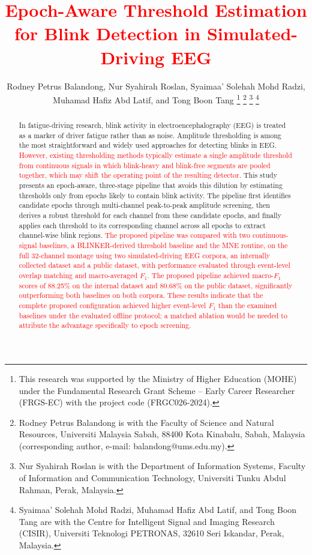 \documentclass[journal,twoside,web]{ieeecolor}
\newcommand{\rev}[1]{\textcolor{red}{#1}}
\begin{document}
%
\title{\rev{Epoch-Aware Threshold Estimation for Blink Detection in Simulated-Driving EEG}}

%
\author{Rodney Petrus Balandong, Nur Syahirah Roslan, Syaimaa' Solehah Mohd Radzi,
Muhamad Hafiz Abd Latif,
%
    and Tong Boon Tang
\thanks{This research was supported by the Ministry of Higher Education (MOHE)
under the Fundamental Research Grant Scheme -- Early Career Researcher
(FRGS-EC) with the project code (FRGC026-2024).}
\thanks{Rodney Petrus Balandong is with the Faculty of Science and Natural
Resources, Universiti Malaysia Sabah, 88400 Kota Kinabalu, Sabah, Malaysia (corresponding
author, e-mail: balandong@ums.edu.my).}
\thanks{Nur Syahirah Roslan is with the Department of Information Systems,
Faculty of Information and Communication Technology, Universiti Tunku Abdul
Rahman, Perak, Malaysia.}
%
%
\thanks{Syaimaa' Solehah Mohd Radzi, Muhamad Hafiz Abd Latif, and Tong Boon
Tang are with the Centre for Intelligent Signal and Imaging Research (CISIR),
Universiti Teknologi PETRONAS, 32610 Seri Iskandar, Perak, Malaysia.}}

\maketitle

%
\begin{abstract}
    In fatigue-driving research, blink activity in electroencephalography (EEG) is treated as a marker of driver fatigue rather than as noise. Amplitude thresholding is among the most straightforward and widely used approaches for detecting blinks in EEG.
\rev{However, existing thresholding methods typically estimate a single amplitude threshold from continuous signals in which blink-heavy and blink-free segments are pooled together, which may shift the operating point of the resulting detector.} This study presents an epoch-aware, three-stage pipeline that avoids this dilution by estimating thresholds only from epochs likely to contain blink activity. The pipeline first identifies candidate epochs through multi-channel peak-to-peak amplitude screening, then derives a robust threshold for each channel from these candidate epochs, and finally applies each threshold to its corresponding channel across all epochs to extract channel-wise blink regions.
\rev{The proposed pipeline was compared with two continuous-signal baselines, a BLINKER-derived threshold baseline and the MNE routine, on the full 32-channel montage using two simulated-driving EEG corpora, an internally collected dataset and a public dataset, with performance evaluated through event-level overlap matching and macro-averaged $F_1$. The proposed pipeline achieved macro-$F_1$ scores of 88.25\% on the internal dataset and 80.68\% on the public dataset, significantly outperforming both baselines on both corpora. These results indicate that the complete proposed configuration achieved higher event-level $F_1$ than the examined baselines under the evaluated offline protocol; a matched ablation would be needed to attribute the advantage specifically to epoch screening.}
\end{abstract}
 
\end{document}
